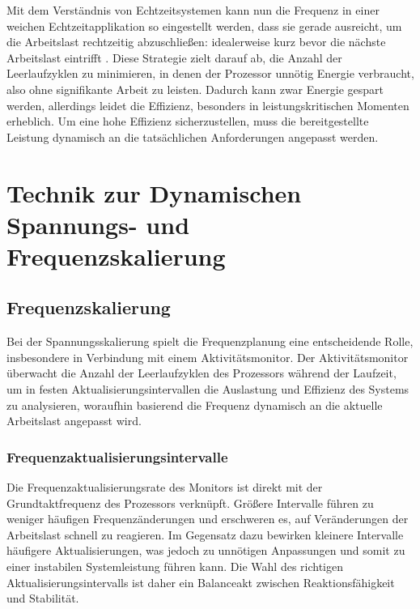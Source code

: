 \documentclass[footmark=none]{tubaf-thesis}
\begin{document}
    			Mit dem Verständnis von Echtzeitsystemen kann nun die Frequenz in einer weichen Echtzeitapplikation so eingestellt werden, dass sie gerade ausreicht, um die Arbeitslast rechtzeitig abzuschließen: idealerweise kurz bevor die nächste Arbeitslast eintrifft \cite{5545490} \cite{5256133}. Diese Strategie zielt darauf ab, die Anzahl der Leerlaufzyklen zu minimieren, in denen der Prozessor unnötig Energie verbraucht, also ohne signifikante Arbeit zu leisten. Dadurch kann zwar Energie gespart werden, allerdings leidet die Effizienz, besonders in leistungskritischen Momenten erheblich. Um eine hohe Effizienz sicherzustellen, muss die bereitgestellte Leistung dynamisch an die tatsächlichen Anforderungen angepasst werden.
    
    \chapter{Technik zur Dynamischen Spannungs- und Frequenzskalierung}
    
    	\section{Frequenzskalierung}
    	\label{chap:Aktivitätsmonitor}
    		Bei der Spannungsskalierung spielt die Frequenzplanung eine entscheidende Rolle, insbesondere in Verbindung mit einem Aktivitätsmonitor. Der Aktivitätsmonitor überwacht die Anzahl der Leerlaufzyklen des Prozessors während der Laufzeit, um in festen Aktualisierungsintervallen die Auslastung und Effizienz des Systems zu analysieren, woraufhin basierend die Frequenz dynamisch an die aktuelle Arbeitslast angepasst wird. \cite{1374987}
    		\subsection{Frequenzaktualisierungsintervalle}
    		Die Frequenzaktualisierungsrate des Monitors ist direkt mit der Grundtaktfrequenz des Prozessors verknüpft. Größere Intervalle führen zu weniger häufigen Frequenzänderungen und erschweren es, auf Veränderungen der Arbeitslast schnell zu reagieren. Im Gegensatz dazu bewirken kleinere Intervalle häufigere Aktualisierungen, was jedoch zu unnötigen Anpassungen und somit zu einer instabilen Systemleistung führen kann. Die Wahl des richtigen Aktualisierungsintervalls ist daher ein Balanceakt zwischen Reaktionsfähigkeit und Stabilität. \cite{5545490} \cite{4110118}
\end{document}
